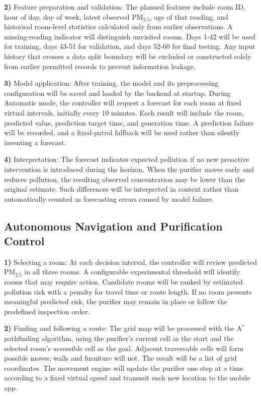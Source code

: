 \documentclass[conference]{IEEEtran}
\begin{document}
\par\noindent\textbf{2)} Feature preparation and validation:
The planned features include room ID, hour of day, day of week, latest observed PM$_{2.5}$, age of that reading, and historical room-level statistics calculated only from earlier observations. A missing-reading indicator will distinguish unvisited rooms. Days 1-42 will be used for training, days 43-51 for validation, and days 52-60 for final testing. Any input history that crosses a data split boundary will be excluded or constructed solely from earlier permitted records to prevent information leakage.

\par\noindent\textbf{3)} Model application:
After training, the model and its preprocessing configuration will be saved and loaded by the backend at startup. During Automatic mode, the controller will request a forecast for each room at fixed virtual intervals, initially every 10 minutes. Each result will include the room, predicted value, prediction target time, and generation time. A prediction failure will be recorded, and a fixed-patrol fallback will be used rather than silently inventing a forecast.

\par\noindent\textbf{4)} Interpretation:
The forecast indicates expected pollution if no new proactive intervention is introduced during the horizon. When the purifier moves early and reduces pollution, the resulting observed concentration may be lower than the original estimate. Such differences will be interpreted in context rather than automatically counted as forecasting errors caused by model failure.

\subsection{Autonomous Navigation and Purification Control}
\par\noindent\textbf{1)} Selecting a room:
At each decision interval, the controller will review predicted PM$_{2.5}$ in all three rooms. A configurable experimental threshold will identify rooms that may require action. Candidate rooms will be ranked by estimated pollution risk with a penalty for travel time or route length. If no room presents meaningful predicted risk, the purifier may remain in place or follow the predefined inspection order.

\par\noindent\textbf{2)} Finding and following a route:
The grid map will be processed with the A$^*$ pathfinding algorithm, using the purifier's current cell as the start and the selected room's accessible cell as the goal. Adjacent traversable cells will form possible moves; walls and furniture will not. The result will be a list of grid coordinates. The movement engine will update the purifier one step at a time according to a fixed virtual speed and transmit each new location to the mobile app.
\end{document}
